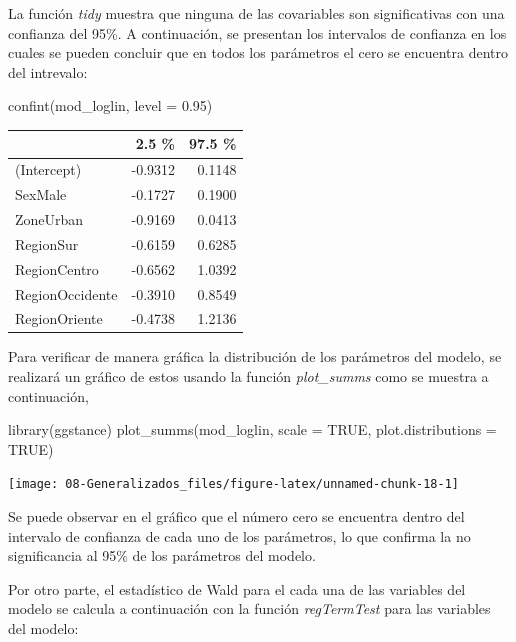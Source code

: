 \documentclass[
  12pt,
]{book}
\newenvironment{Shaded}{\begin{snugshade}}{\end{snugshade}}
\newcommand{\AttributeTok}[1]{\textcolor[rgb]{0.77,0.63,0.00}{#1}}
\newcommand{\ConstantTok}[1]{\textcolor[rgb]{0.00,0.00,0.00}{#1}}
\newcommand{\FloatTok}[1]{\textcolor[rgb]{0.00,0.00,0.81}{#1}}
\newcommand{\FunctionTok}[1]{\textcolor[rgb]{0.00,0.00,0.00}{#1}}
\newcommand{\NormalTok}[1]{#1}
\begin{document}
La función \emph{tidy} muestra que ninguna de las covariables son significativas con una confianza del 95\%. A continuación, se presentan los intervalos de confianza en los cuales se pueden concluir que en todos los parámetros el cero se encuentra dentro del intrevalo:

\begin{Shaded}
\begin{Highlighting}[]
\FunctionTok{confint}\NormalTok{(mod\_loglin, }\AttributeTok{level =} \FloatTok{0.95}\NormalTok{) }
\end{Highlighting}
\end{Shaded}

\begin{tabular}{l|r|r}
\hline
  & 2.5 \% & 97.5 \%\\
\hline
(Intercept) & -0.9312 & 0.1148\\
\hline
SexMale & -0.1727 & 0.1900\\
\hline
ZoneUrban & -0.9169 & 0.0413\\
\hline
RegionSur & -0.6159 & 0.6285\\
\hline
RegionCentro & -0.6562 & 1.0392\\
\hline
RegionOccidente & -0.3910 & 0.8549\\
\hline
RegionOriente & -0.4738 & 1.2136\\
\hline
\end{tabular}

Para verificar de manera gráfica la distribución de los parámetros del modelo, se realizará un gráfico de estos usando la función \emph{plot\_summs} como se muestra a continuación,

\begin{Shaded}
\begin{Highlighting}[]
\FunctionTok{library}\NormalTok{(ggstance)}
\FunctionTok{plot\_summs}\NormalTok{(mod\_loglin, }
             \AttributeTok{scale =} \ConstantTok{TRUE}\NormalTok{, }\AttributeTok{plot.distributions =} \ConstantTok{TRUE}\NormalTok{)}
\end{Highlighting}
\end{Shaded}

\texttt{[image: 08-Generalizados\_files/figure-latex/unnamed-chunk-18-1]}

Se puede observar en el gráfico que el número cero se encuentra dentro del intervalo de confianza de cada uno de los parámetros, lo que confirma la no significancia al 95\% de los parámetros del modelo.

Por otro parte, el estadístico de Wald para el cada una de las variables del modelo se calcula a continuación con la función \emph{regTermTest} para las variables del modelo:
\end{document}
